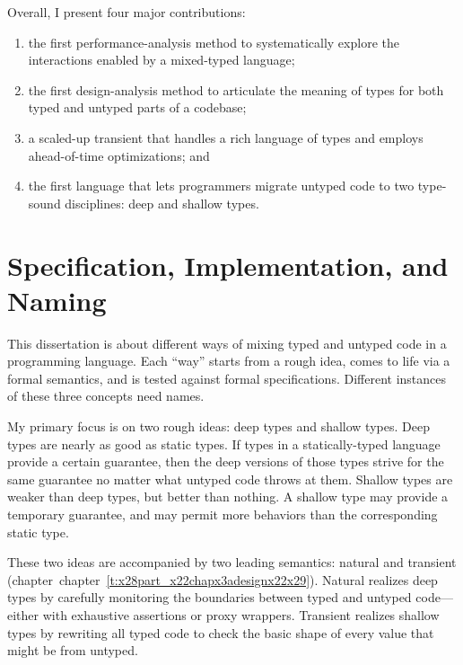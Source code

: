 \documentclass[ twoside,open=right,titlepage,numbers=noenddot,headinclude,%
                footinclude=true,cleardoublepage=empty,abstract=off,
                BCOR=5mm,paper=a4,fontsize=11pt,%
                ngerman,american,%
                parts,pdfspacing]{scrreprt}
\newcommand{\ChapRef}[2]{\SecRef{#1}{#2}}
\newcommand{\SecRef}[2]{section~#1}
\newcommand{\ChapRefLocal}[3]{\hyperref[#1]{\ChapRef{#2}{#3}}}
\newlength{\stabLeft}
\newcommand{\atItemizeStart}[0]{\addtolength{\stabLeft}{\labelsep}
                                \addtolength{\stabLeft}{\labelwidth}}
\let\SOriginalthesubsubsection\thesubsubsection
\newcommand{\Ssubsection}[2]{\subsection[#1]{#2}\let\thesubsubsection\SOriginalthesubsubsection}
\renewcommand{\Ssubsection}[2]{\section[#1]{#2}}
\renewcommand{\ChapRefLocal}[3]{chapter~\ref{#1}}
\begin{document}
Overall, I present four major contributions:


\noindent \begin{enumerate}\atItemizeStart

\item the first performance{-}analysis method to systematically explore the
 interactions enabled by a mixed{-}typed language;

\item the first design{-}analysis method to articulate the meaning of types for
 both typed and untyped parts of a codebase;

\item a scaled{-}up transient that handles a rich language of types and
 employs ahead{-}of{-}time optimizations; and

\item the first language that lets programmers migrate untyped code to two
 type{-}sound disciplines: deep and shallow types.\end{enumerate}

\Ssubsection{Specification, Implementation, and Naming}{Specification, Implementation, and Naming}\label{t:x28part_x22Specificationx5fx5fImplementationx5fx5fandx5fNamingx22x29}

This dissertation is about different ways of mixing typed and untyped code
 in a programming language.
Each {``}way{''} starts from a rough idea, comes to life via a formal semantics,
 and is tested against formal specifications.
Different instances of these three concepts need names.

My primary focus is on two rough ideas: deep types and shallow types.
Deep types are nearly as good as static types.
If types in a statically{-}typed language provide a certain guarantee, then
 the deep versions of those types strive for the same guarantee no matter
 what untyped code throws at them.
Shallow types are weaker than deep types, but better than nothing.
A shallow type may provide a temporary guarantee, and may permit more
 behaviors than the corresponding static type.

These two ideas are accompanied by two leading semantics: natural
 and transient (chapter~\ChapRefLocal{t:x28part_x22chapx3adesignx22x29}{4}{Design Analysis Method}).
Natural realizes deep types by carefully monitoring the boundaries
 between typed and untyped code{---}either with exhaustive assertions or proxy
 wrappers.
Transient realizes shallow types by rewriting all typed code to
 check the basic shape of every value that might be from untyped.
\end{document}
